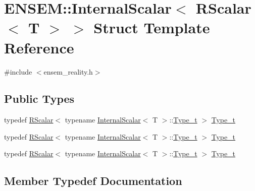 \hypertarget{structENSEM_1_1InternalScalar_3_01RScalar_3_01T_01_4_01_4}{}\section{E\+N\+S\+EM\+:\+:Internal\+Scalar$<$ R\+Scalar$<$ T $>$ $>$ Struct Template Reference}
\label{structENSEM_1_1InternalScalar_3_01RScalar_3_01T_01_4_01_4}


{\ttfamily \#include $<$ensem\+\_\+reality.\+h$>$}

\subsection*{Public Types}
\begin{DoxyCompactItemize}
\item 
typedef \mbox{\hyperlink{classENSEM_1_1RScalar}{R\+Scalar}}$<$ typename \mbox{\hyperlink{structENSEM_1_1InternalScalar}{Internal\+Scalar}}$<$ T $>$\+::\mbox{\hyperlink{structENSEM_1_1InternalScalar_3_01RScalar_3_01T_01_4_01_4_a2acb8111a19ee425e0751d1355d5151e}{Type\+\_\+t}} $>$ \mbox{\hyperlink{structENSEM_1_1InternalScalar_3_01RScalar_3_01T_01_4_01_4_a2acb8111a19ee425e0751d1355d5151e}{Type\+\_\+t}}
\item 
typedef \mbox{\hyperlink{classENSEM_1_1RScalar}{R\+Scalar}}$<$ typename \mbox{\hyperlink{structENSEM_1_1InternalScalar}{Internal\+Scalar}}$<$ T $>$\+::\mbox{\hyperlink{structENSEM_1_1InternalScalar_3_01RScalar_3_01T_01_4_01_4_a2acb8111a19ee425e0751d1355d5151e}{Type\+\_\+t}} $>$ \mbox{\hyperlink{structENSEM_1_1InternalScalar_3_01RScalar_3_01T_01_4_01_4_a2acb8111a19ee425e0751d1355d5151e}{Type\+\_\+t}}
\item 
typedef \mbox{\hyperlink{classENSEM_1_1RScalar}{R\+Scalar}}$<$ typename \mbox{\hyperlink{structENSEM_1_1InternalScalar}{Internal\+Scalar}}$<$ T $>$\+::\mbox{\hyperlink{structENSEM_1_1InternalScalar_3_01RScalar_3_01T_01_4_01_4_a2acb8111a19ee425e0751d1355d5151e}{Type\+\_\+t}} $>$ \mbox{\hyperlink{structENSEM_1_1InternalScalar_3_01RScalar_3_01T_01_4_01_4_a2acb8111a19ee425e0751d1355d5151e}{Type\+\_\+t}}
\end{DoxyCompactItemize}


\subsection{Member Typedef Documentation}
\mbox{\label{structENSEM_1_1InternalScalar_3_01RScalar_3_01T_01_4_01_4_a2acb8111a19ee425e0751d1355d5151e}} 
